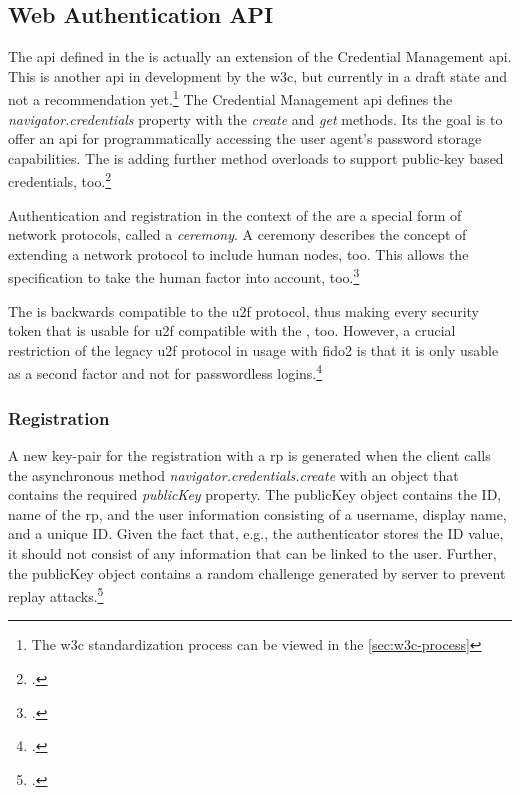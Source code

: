 \subsection{Web Authentication API}
\label{subsec:wa}

The \gls{api} defined in the \wa{} is actually an extension of the Credential Management \gls{api}. This is another \gls{api} in development by the \gls{w3c}, but currently in a draft state and not a recommendation yet.\footnote{The \gls{w3c} standardization process can be viewed in the \autoref{sec:w3c-process}} The Credential Management \gls{api} defines the \textit{navigator.credentials} property with the \textit{create} and \textit{get} methods. Its the goal is to offer an \gls{api} for programmatically accessing the user agent's password storage capabilities. The \wa{} is adding further method overloads to support public-key based credentials, too.\footcites[See][Chapter 1]{w3c}[See][Chapter 1.1]{w3c-credentials}

Authentication and registration in the context of the \wa{} are a special form of network protocols, called a \textit{ceremony}. A ceremony describes the concept of extending a network protocol to include human nodes, too. This allows the specification to take the human factor into account, too.\footcite[See][2]{Ellison2007CeremonyDA}

The \wa{} is backwards compatible to the \gls{u2f} protocol, thus making every security token that is usable for \gls{u2f} compatible with the \wa, too. However, a crucial restriction of the legacy \gls{u2f} protocol in usage with \gls{fido}2 is that it is only usable as a second factor and not for passwordless logins.\footcites[See][Chapter 2.2.1, 6.1.2]{w3c}

\subsubsection{Registration}

A new key-pair for the registration with a \gls{rp} is generated when the client calls the asynchronous method \textit{navigator.credentials.create} with an object that contains the required \textit{publicKey} property. The publicKey object contains the ID, name of the \gls{rp}, and the user information consisting of a username, display name, and a unique ID. Given the fact that, e.g., the authenticator stores the ID value, it should not consist of any information that can be linked to the user. Further, the publicKey object contains a random challenge generated by server to prevent replay attacks.\footcites[See][Chapter 5.1.3]{w3c}


